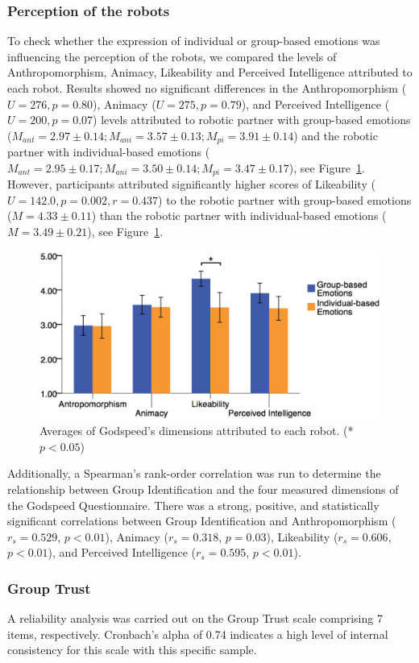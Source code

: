 \subsubsection{Perception of the robots}

To check whether the expression of individual or group-based emotions was influencing the perception of the robots, we compared the levels of Anthropomorphism, Animacy, Likeability and Perceived Intelligence attributed to each robot. Results showed no significant differences in the Anthropomorphism ($U=276, p=0.80$), Animacy ($U=275, p=0.79$), and Perceived Intelligence ($U=200, p=0.07$) levels attributed to robotic partner with group-based emotions ($M_{ant}=2.97\pm0.14;M_{ani}=3.57\pm0.13;M_{pi}=3.91\pm0.14$) and the robotic partner with individual-based emotions ($M_{ant}=2.95\pm0.17;M_{ani}=3.50\pm0.14;M_{pi}=3.47\pm0.17$), see Figure~\ref{fig:godspeed}. However, participants attributed significantly higher scores of Likeability ($U=142.0, p=0.002, r=0.437$) to the robotic partner with group-based emotions ($M=4.33\pm0.11$) than the robotic partner with individual-based emotions ($M=3.49\pm0.21$), see Figure~\ref{fig:godspeed}.


\begin{figure}[ht]
    \centering
    \includegraphics[width=0.7\columnwidth]{images/gbe/godspeed2.png}
    \caption{Averages of Godspeed's dimensions attributed to each robot. (*$p<0.05$)}
    \label{fig:godspeed}
\end{figure}

Additionally, a Spearman's rank-order correlation was run to determine the relationship between Group Identification and the four measured dimensions of the Godspeed Questionnaire. There was a strong, positive, and statistically significant correlations between Group Identification and Anthropomorphism ($r_s=0.529$,  $p<0.01$), Animacy ($r_s=0.318$, $p=0.03$), Likeability ($r_s=0.606$, $p<0.01$), and Perceived Intelligence ($r_s=0.595$, $p<0.01$).

\subsubsection{Group Trust}
A reliability analysis was carried out on the Group Trust scale comprising 7 items, respectively. Cronbach's alpha of 0.74 indicates a high level of internal consistency for this scale with this specific sample.

